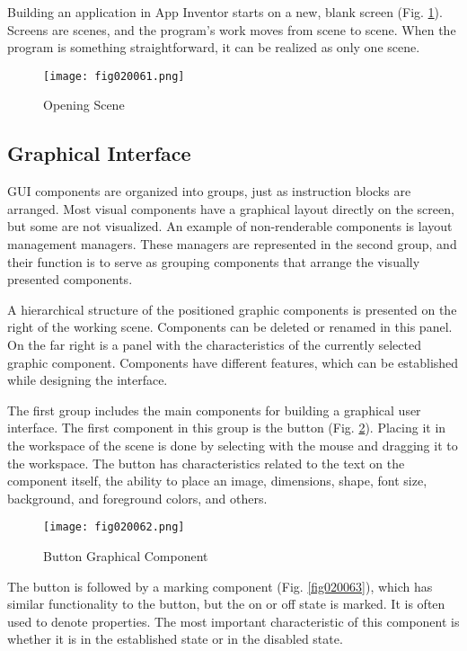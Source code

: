 Building an application in App Inventor starts on a new, blank screen (Fig. \ref{fig020061}). Screens are scenes, and the program's work moves from scene to scene. When the program is something straightforward, it can be realized as only one scene.

\begin{figure}[H]
   \centering
   \texttt{[image: fig020061.png]}
   \caption{Opening Scene}
\label{fig020061}
\end{figure}

\subsection{Graphical Interface}

GUI components are organized into groups, just as instruction blocks are arranged. Most visual components have a graphical layout directly on the screen, but some are not visualized. An example of non-renderable components is layout management managers. These managers are represented in the second group, and their function is to serve as grouping components that arrange the visually presented components.

A hierarchical structure of the positioned graphic components is presented on the right of the working scene. Components can be deleted or renamed in this panel. On the far right is a panel with the characteristics of the currently selected graphic component. Components have different features, which can be established while designing the interface.

The first group includes the main components for building a graphical user interface. The first component in this group is the button (Fig. \ref{fig020062}). Placing it in the workspace of the scene is done by selecting with the mouse and dragging it to the workspace. The button has characteristics related to the text on the component itself, the ability to place an image, dimensions, shape, font size, background, and foreground colors, and others.

\begin{figure}[H]
   \centering
   \texttt{[image: fig020062.png]}
   \caption{Button Graphical Component}
\label{fig020062}
\end{figure}

The button is followed by a marking component (Fig. \ref{fig020063}), which has similar functionality to the button, but the on or off state is marked. It is often used to denote properties. The most important characteristic of this component is whether it is in the established state or in the disabled state.


